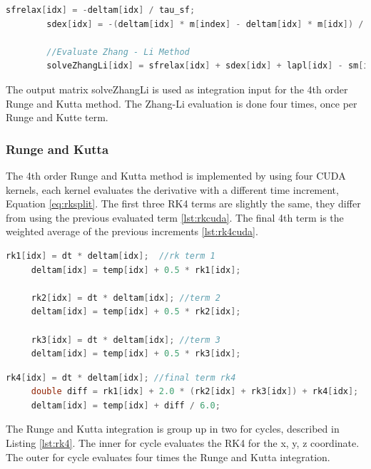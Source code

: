 \begin{lstlisting}[language=C++, label={lst:zhangcuda}, caption={Zhang-Li evaluation}]
		sfrelax[idx] = -deltam[idx] / tau_sf;
		sdex[idx] = -(deltam[idx] * m[index] - deltam[idx] * m[idx]) / tau_sd;
		
		//Evaluate Zhang - Li Method
        solveZhangLi[idx] = sfrelax[idx] + sdex[idx] + lapl[idx] - sm[idx];
\end{lstlisting}

The output matrix {\listf solveZhangLi} is used as integration input for the 4th order Runge and Kutta method. The Zhang-Li evaluation is done four times, once per Runge and Kutte term.

\subsubsection{Runge and Kutta}
 
The 4th order Runge and Kutta method is implemented by using four CUDA kernels, each kernel evaluates the derivative with a different time increment, Equation \ref{eq:rksplit}. The first three RK4 terms are slightly the same, they differ from using the previous evaluated term \ref{lst:rkcuda}. The final 4th term is the weighted average of the previous increments \ref{lst:rk4cuda}.

\begin{lstlisting}[language=C++, label={lst:rkcuda}, caption={Runge and Kutta 1st, 2nd and 3rd terms}]
     rk1[idx] = dt * deltam[idx];  //rk term 1
     deltam[idx] = temp[idx] + 0.5 * rk1[idx];
     
     rk2[idx] = dt * deltam[idx]; //term 2
     deltam[idx] = temp[idx] + 0.5 * rk2[idx];
     
     rk3[idx] = dt * deltam[idx]; //term 3
     deltam[idx] = temp[idx] + 0.5 * rk3[idx];
\end{lstlisting}
    
\begin{lstlisting}[language=C++, label={lst:rk4cuda}, caption={4th term of the Runge and Kutta integration}] 
     rk4[idx] = dt * deltam[idx]; //final term rk4
     double diff = rk1[idx] + 2.0 * (rk2[idx] + rk3[idx]) + rk4[idx];
     deltam[idx] = temp[idx] + diff / 6.0;	
\end{lstlisting}


The Runge and Kutta integration is group up in two {\listf for} cycles, described in Listing \ref{lst:rk4}. The inner {\listf for} cycle evaluates the RK4 for the x, y, z coordinate. The outer {\listf for} cycle evaluates four times the Runge and Kutta integration.

